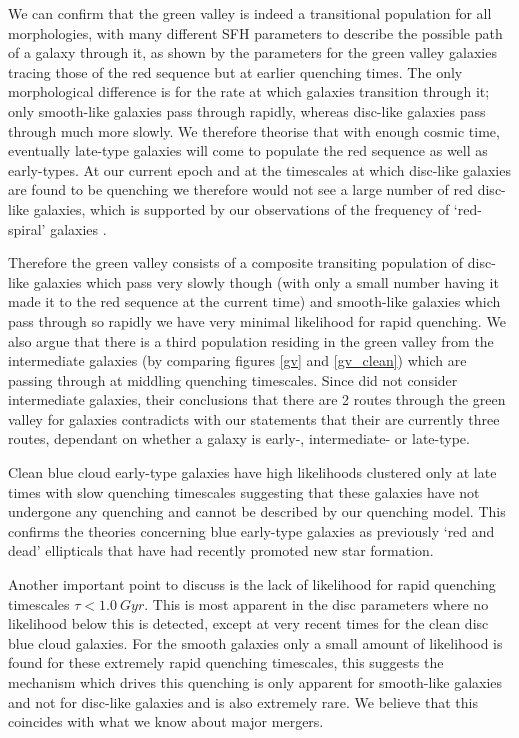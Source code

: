 \documentclass{mn2e}
\begin{document}
We can confirm that the green valley is indeed a transitional population for all morphologies, with many different SFH parameters to describe the possible path of a galaxy through it, as shown by the parameters for the green valley galaxies tracing those of the red sequence but at earlier quenching times. The only morphological difference is for the rate at which galaxies transition through it; only smooth-like galaxies pass through rapidly, whereas disc-like galaxies pass through much more slowly. We therefore theorise that with enough cosmic time, eventually late-type galaxies will come to populate the red sequence as well as early-types. At our current epoch and at the timescales at which disc-like galaxies are found to be quenching we therefore would not see a large number of red disc-like galaxies, which is supported by our observations of the frequency of `red-spiral' galaxies \citep{Bamford09, Skibba09, Masters10, Masters10b}.

Therefore the green valley consists of a composite transiting population of disc-like galaxies which pass very slowly though (with only a small number having it made it to the red sequence at the current time) and smooth-like galaxies which pass through so rapidly we have very minimal likelihood for rapid quenching. We also argue that there is a third population residing in the green valley from the intermediate galaxies (by comparing figures \ref{gv} and \ref{gv_clean}) which are passing through at middling quenching timescales. Since \citet{Sch2014} did not consider intermediate galaxies, their conclusions that there are 2 routes through the green valley for galaxies contradicts with our statements that their are currently three routes, dependant on whether a galaxy is early-, intermediate- or late-type. 

Clean blue cloud early-type galaxies have high likelihoods clustered only at late times with slow quenching timescales suggesting that these galaxies have not undergone any quenching and cannot be described by our quenching model. This confirms the theories concerning blue early-type galaxies \citep{Sch09} as previously `red and dead' ellipticals that have had recently promoted new star formation.

Another important point to discuss is the lack of likelihood for rapid quenching timescales $\tau < 1.0~Gyr$. This is most apparent in the disc parameters where no likelihood below this is detected, except at very recent times for the clean disc blue cloud galaxies. For the smooth galaxies only a small amount of likelihood is found for these extremely rapid quenching timescales, this suggests the mechanism which drives this quenching is only apparent for smooth-like galaxies and not for disc-like galaxies and is also extremely rare. We believe that this coincides with what we know about major mergers. 
\end{document}
